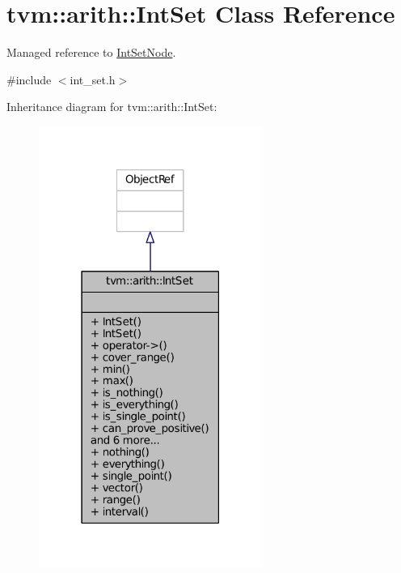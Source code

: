 \hypertarget{classtvm_1_1arith_1_1IntSet}{}\section{tvm\+:\+:arith\+:\+:Int\+Set Class Reference}
\label{classtvm_1_1arith_1_1IntSet}


Managed reference to \hyperlink{classtvm_1_1arith_1_1IntSetNode}{Int\+Set\+Node}.  




{\ttfamily \#include $<$int\+\_\+set.\+h$>$}



Inheritance diagram for tvm\+:\+:arith\+:\+:Int\+Set\+:
\nopagebreak
\begin{figure}[H]
\begin{center}
\leavevmode
\includegraphics[width=207pt]{classtvm_1_1arith_1_1IntSet__inherit__graph}
\end{center}
\end{figure}


